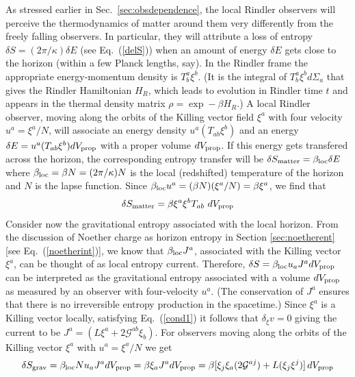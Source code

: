 \documentclass[12pt]{iopart}
\def\eq#1{{Eq.~(\ref{#1})}}
\begin{document}
 
 As stressed earlier in Sec.~\ref{sec:obsdependence}, the local Rindler observers will perceive the thermodynamics of matter around them very differently from the freely falling observers. In particular, they will attribute a loss of entropy $\delta S = (2\pi/\kappa) \delta E$ (see \eq{delS}) when an amount of energy $\delta E$ gets close to the horizon
 (within a few Planck lengths, say). In the Rindler frame the appropriate energy-momentum  density is $T^a_b\xi^b$. (It is the integral of $T^a_b\xi^b d\Sigma_a$ that gives the Rindler Hamiltonian $H_R$, which leads to evolution in Rindler time $t$ and appears in the thermal density matrix $\rho=\exp-\beta H_R$.) 
 A local Rindler observer, moving along the orbits of the Killing vector field $\xi^a$ with four velocity $u^a = \xi^a/N$, will associate an energy density $u^a(T_{ab}\xi^b)$ and an energy
  $\delta E =u^a(T_{ab}\xi^b) dV_{\rm prop}$ with a proper volume $dV_{\rm prop}$.
  If this energy gets transfered across the horizon, the corresponding entropy transfer will be $\delta S_{\rm matter} = \beta_{\rm loc}\delta E$ where $\beta_{\rm loc} = \beta N = 
(2\pi/\kappa)N$ is the local  (redshifted) temperature of the horizon
 and $N$ is the lapse function. 
 Since $\beta_{\rm loc} u^a = (\beta N)(\xi^a/N) = \beta \xi^a$, we find that 
\begin{equation}
 \delta S_{\rm matter} = \beta \xi^a \xi^b T_{ab}\ dV_{\rm prop}
 \label{defsmatter}
\end{equation} 
Consider now the gravitational entropy associated with the local horizon. From the 
discussion of Noether charge as horizon entropy in Section \ref{sec:noetherent} [see \eq{noetherint}], we know that $\beta_{\rm loc} J^a$, 
associated with the Killing vector $\xi^a$,
can be thought of 
as local entropy current. Therefore,  $\delta S = \beta_{\rm loc} u_a J^a dV_{\rm prop}$ can be interpreted
as the gravitational entropy associated with a volume $dV_{\rm prop}$ as measured
by an observer with four-velocity $u^a$. (The conservation of  $J^a$ ensures that  there is no irreversible entropy production in the spacetime.)
   Since $\xi^a$ is a Killing vector locally, satisfying \eq{cond1} it follows that $\delta_\xi v=0$ giving the current to be
$
J^a = \left( L \xi^a + 2 \mathcal{G}^{a b} \xi_b \right) $.
 For observers moving along the orbits of the Killing vector $\xi^a$
with $u^a = \xi^a/N$  we get
\begin{equation}
\delta S_{\rm grav} = \beta_{\rm loc} N u_a J^a dV_{\rm prop} =\beta \xi_a J^a dV_{\rm prop} =\beta  [\xi_j \xi_a (2\mathcal{G}^{aj}) +  L  (\xi_j \xi^j)]\, dV_{\rm prop}
\end{equation} 
\end{document}
